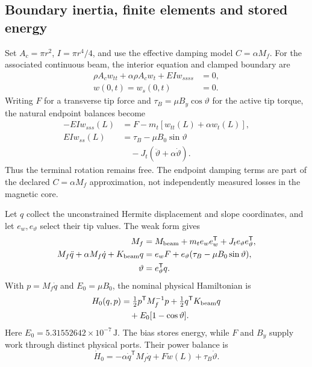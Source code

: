 \subsection{Boundary inertia, finite elements and stored energy}
\label{mech:finite-elements}
Set $A_c=\pi r^2$, $I=\pi r^4/4$, and use the effective damping model
$C=\alpha M_f$. For the associated continuous beam, the interior
equation and clamped boundary are
\begin{align}
 \rho A_cw_{tt}+\alpha\rho A_cw_t+EIw_{ssss}&=0,\nonumber\\
 w(0,t)=w_s(0,t)&=0.
 \label{mech:beam}
\end{align}
Writing $F$ for a transverse tip force and
$\tau_B=\mu B_y\cos\vartheta$ for the active tip torque, the natural
endpoint balances become
\begin{align}
 -EIw_{sss}(L)&=F-m_t[w_{tt}(L)+\alpha w_t(L)],\nonumber\\
 EIw_{ss}(L)&=\tau_B-\mu B_0\sin\vartheta\nonumber\\
 &\quad-J_t(\ddot\vartheta+\alpha\dot\vartheta).
 \label{mech:endpoint-balance}
\end{align}
Thus the terminal rotation remains free. The endpoint damping terms are
part of the declared $C=\alpha M_f$ approximation, not independently
measured losses in the magnetic core.

Let $q$ collect the unconstrained Hermite displacement and slope
coordinates, and let $e_w,e_\vartheta$ select their tip values. The weak
form gives
\begin{align}
 M_f&=M_{\rm beam}+m_te_we_w^{\mathsf T}
                         +J_te_\vartheta e_\vartheta^{\mathsf T},\nonumber\\
 M_f\ddot q+\alpha M_f\dot q+K_{\rm beam}q
 &=e_wF+e_\vartheta(\tau_B-\mu B_0\sin\vartheta),\nonumber\\
 \vartheta&=e_\vartheta^{\mathsf T}q.
 \label{mech:fe-plant}
\end{align}
With $p=M_f\dot q$ and $E_0=\mu B_0$, the nominal physical Hamiltonian is
\begin{align}
 H_0(q,p)&=\tfrac12p^{\mathsf T}M_f^{-1}p
             +\tfrac12q^{\mathsf T}K_{\rm beam}q\nonumber\\
 &\quad+E_0[1-\cos\vartheta].
 \label{mech:fe-energy}
\end{align}
Here $E_0=5.31552642\times10^{-7}\,\mathrm J$.
The bias stores energy, while $F$ and $B_y$ supply work through distinct
physical ports. Their power balance is
\begin{equation}
 \dot H_0=-\alpha\dot q^{\mathsf T}M_f\dot q
              +F\dot w(L)+\tau_B\dot\vartheta.
 \label{mech:physical-power}
\end{equation}

